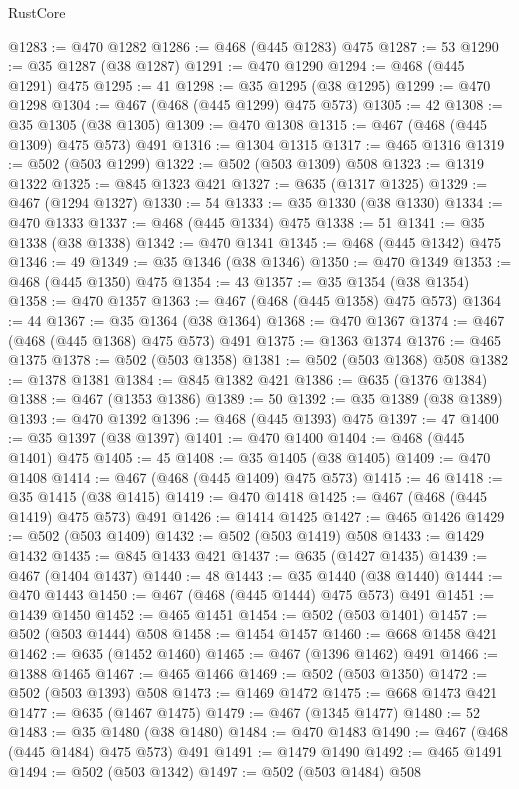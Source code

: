 \begin{lexlean}{RustCore}
\begin{coremodule}
@1283 := @470 @1282
@1286 := @468 (@445 @1283) @475
@1287 := 53
@1290 := @35 @1287 (@38 @1287)
@1291 := @470 @1290
@1294 := @468 (@445 @1291) @475
@1295 := 41
@1298 := @35 @1295 (@38 @1295)
@1299 := @470 @1298
@1304 := @467 (@468 (@445 @1299) @475 @573)
@1305 := 42
@1308 := @35 @1305 (@38 @1305)
@1309 := @470 @1308
@1315 := @467 (@468 (@445 @1309) @475 @573) @491
@1316 := @1304 @1315
@1317 := @465 @1316
@1319 := @502 (@503 @1299)
@1322 := @502 (@503 @1309) @508
@1323 := @1319 @1322
@1325 := @845 @1323 @421
@1327 := @635 (@1317 @1325)
@1329 := @467 (@1294 @1327)
@1330 := 54
@1333 := @35 @1330 (@38 @1330)
@1334 := @470 @1333
@1337 := @468 (@445 @1334) @475
@1338 := 51
@1341 := @35 @1338 (@38 @1338)
@1342 := @470 @1341
@1345 := @468 (@445 @1342) @475
@1346 := 49
@1349 := @35 @1346 (@38 @1346)
@1350 := @470 @1349
@1353 := @468 (@445 @1350) @475
@1354 := 43
@1357 := @35 @1354 (@38 @1354)
@1358 := @470 @1357
@1363 := @467 (@468 (@445 @1358) @475 @573)
@1364 := 44
@1367 := @35 @1364 (@38 @1364)
@1368 := @470 @1367
@1374 := @467 (@468 (@445 @1368) @475 @573) @491
@1375 := @1363 @1374
@1376 := @465 @1375
@1378 := @502 (@503 @1358)
@1381 := @502 (@503 @1368) @508
@1382 := @1378 @1381
@1384 := @845 @1382 @421
@1386 := @635 (@1376 @1384)
@1388 := @467 (@1353 @1386)
@1389 := 50
@1392 := @35 @1389 (@38 @1389)
@1393 := @470 @1392
@1396 := @468 (@445 @1393) @475
@1397 := 47
@1400 := @35 @1397 (@38 @1397)
@1401 := @470 @1400
@1404 := @468 (@445 @1401) @475
@1405 := 45
@1408 := @35 @1405 (@38 @1405)
@1409 := @470 @1408
@1414 := @467 (@468 (@445 @1409) @475 @573)
@1415 := 46
@1418 := @35 @1415 (@38 @1415)
@1419 := @470 @1418
@1425 := @467 (@468 (@445 @1419) @475 @573) @491
@1426 := @1414 @1425
@1427 := @465 @1426
@1429 := @502 (@503 @1409)
@1432 := @502 (@503 @1419) @508
@1433 := @1429 @1432
@1435 := @845 @1433 @421
@1437 := @635 (@1427 @1435)
@1439 := @467 (@1404 @1437)
@1440 := 48
@1443 := @35 @1440 (@38 @1440)
@1444 := @470 @1443
@1450 := @467 (@468 (@445 @1444) @475 @573) @491
@1451 := @1439 @1450
@1452 := @465 @1451
@1454 := @502 (@503 @1401)
@1457 := @502 (@503 @1444) @508
@1458 := @1454 @1457
@1460 := @668 @1458 @421
@1462 := @635 (@1452 @1460)
@1465 := @467 (@1396 @1462) @491
@1466 := @1388 @1465
@1467 := @465 @1466
@1469 := @502 (@503 @1350)
@1472 := @502 (@503 @1393) @508
@1473 := @1469 @1472
@1475 := @668 @1473 @421
@1477 := @635 (@1467 @1475)
@1479 := @467 (@1345 @1477)
@1480 := 52
@1483 := @35 @1480 (@38 @1480)
@1484 := @470 @1483
@1490 := @467 (@468 (@445 @1484) @475 @573) @491
@1491 := @1479 @1490
@1492 := @465 @1491
@1494 := @502 (@503 @1342)
@1497 := @502 (@503 @1484) @508

\end{coremodule}
\end{lexlean}

